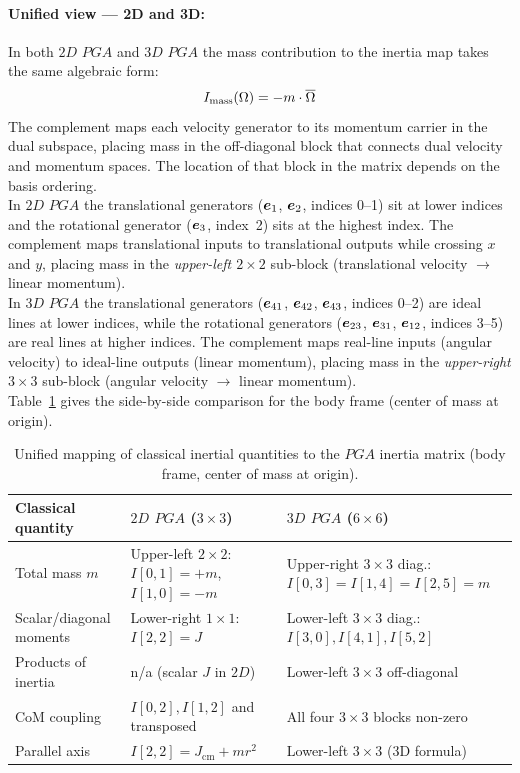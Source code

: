 \paragraph{Unified view --- 2D and 3D:}
In both $2D$ $PGA$ and $3D$ $PGA$ the mass contribution to the inertia map takes the same
algebraic form:
\begin{equation}
    I_\mathrm{mass}(\Omega) = -m \cdot \overline{\Omega}
    \label{eq:inertia_mass_dual}
\end{equation}
The complement maps each velocity generator to its momentum carrier in the dual subspace,
placing mass in the off-diagonal block that connects dual velocity and momentum spaces.
The location of that block in the matrix depends on the basis ordering. \\

In $2D$ $PGA$ the translational generators ($\bm{e}_{1}$, $\bm{e}_{2}$, indices 0--1) sit at lower
indices and the rotational generator ($\bm{e}_{3}$, index~2) sits at the highest index. The
complement maps translational inputs to translational outputs while crossing $x$ and $y$,
placing mass in the \emph{upper-left $2\times2$} sub-block (translational velocity $\to$
linear momentum). \\

In $3D$ $PGA$ the translational generators ($\bm{e}_{41}$, $\bm{e}_{42}$, $\bm{e}_{43}$, indices 0--2)
are ideal lines at lower indices, while the rotational generators ($\bm{e}_{23}$, $\bm{e}_{31}$,
$\bm{e}_{12}$, indices 3--5) are real lines at higher indices. The complement maps real-line
inputs (angular velocity) to ideal-line outputs (linear momentum), placing mass in the
\emph{upper-right $3\times3$} sub-block (angular velocity $\to$ linear momentum). \\

Table~\ref{tab:unified_pga} gives the side-by-side comparison for the body frame (center
of mass at origin).

\begin{table}[h!]
\centering\small
\begin{tabular}{p{3.1cm}|p{4.1cm}|p{5.1cm}}
\hline
Classical quantity & $2D$ $PGA$ ($3\times3$) & $3D$ $PGA$ ($6\times6$) \\
\hline
Total mass $m$ &
    Upper-left $2\times2$: $I[0,1]=+m$, $I[1,0]=-m$ &
    Upper-right $3\times3$ diag.: $I[0,3]=I[1,4]=I[2,5]=m$ \\
Scalar/diagonal moments &
    Lower-right $1\times1$: $I[2,2]=J$ &
    Lower-left $3\times3$ diag.: $I[3,0], I[4,1], I[5,2]$ \\
Products of inertia &
    n/a (scalar $J$ in $2D$) &
    Lower-left $3\times3$ off-diagonal \\
CoM coupling &
    $I[0,2], I[1,2]$ and transposed &
    All four $3\times3$ blocks non-zero \\
Parallel axis &
    $I[2,2] = J_\mathrm{cm} + mr^2$ &
    Lower-left $3\times3$ (3D formula) \\
\hline
\end{tabular}
\caption{Unified mapping of classical inertial quantities to the $PGA$ inertia matrix
(body frame, center of mass at origin).}
\label{tab:unified_pga}
\end{table}


